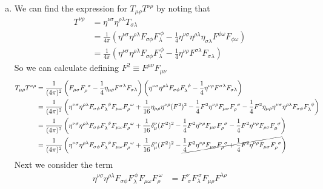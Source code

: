 \documentclass[11pt]{article}
\numberwithin{equation}{section}
\begin{document}
\begin{enumerate}[(a)]
\item
    We can find the expression for $T_{\mu\rho}T^{\nu\rho}$ by noting that
    \begin{align*}
        T^{\nu\rho} &= \eta^{\nu\sigma}\eta^{\rho\lambda}T_{\sigma\lambda}\\
                    &= \frac{1}{4\pi}\left(\eta^{\nu\sigma}\eta^{\rho\lambda}F_{\sigma\phi}F_{\lambda}^{\ \phi} - \frac{1}{4}\eta^{\nu\sigma}\eta^{\rho\lambda}\eta_{\sigma\lambda}F^{\phi\omega}F_{\phi\omega}\right)\\
                    &= \frac{1}{4\pi}\left(\eta^{\nu\sigma}\eta^{\rho\lambda}F_{\sigma\phi}F_{\lambda}^{\ \phi} - \frac{1}{4}\eta^{\nu\rho}F^{\sigma\lambda}F_{\sigma\lambda}\right)
    \end{align*}
    So we can calculate defining $F^2\equiv F^{\mu\nu}F_{\mu\nu}$
    \begin{align*}
        T_{\mu\rho}T^{\nu\rho} &= \frac{1}{(4\pi)^2}\left(F_{\mu\sigma}F^{\ \sigma}_{\rho} - \frac{1}{4}\eta_{\mu\rho}F^{\sigma\lambda}F_{\sigma\lambda} \right)\left(\eta^{\nu\sigma}\eta^{\rho\lambda}F_{\sigma\phi}F_{\lambda}^{\ \phi} - \frac{1}{4}\eta^{\nu\rho}F^{\sigma\lambda}F_{\sigma\lambda}\right)\\
                               &= \frac{1}{(4\pi)^2}\left(\eta^{\nu\sigma}\eta^{\rho\lambda}F_{\sigma\phi}F_{\lambda}^{\ \phi}F_{\mu\omega}F^{\ \omega}_{\rho} + \frac{1}{16}\eta_{\mu\rho}\eta^{\nu\rho}(F^2)^2 - \frac{1}{4}F^2\eta^{\nu\rho}F_{\mu\sigma}F^{\ \sigma}_{\rho} - \frac{1}{4}F^2\eta_{\mu\rho}\eta^{\nu\sigma}\eta^{\rho\lambda}F_{\sigma\phi}F_{\lambda}^{\ \phi}\right)\\
                               &= \frac{1}{(4\pi)^2}\left(\eta^{\nu\sigma}\eta^{\rho\lambda}F_{\sigma\phi}F_{\lambda}^{\ \phi}F_{\mu\omega}F^{\ \omega}_{\rho} + \frac{1}{16}\delta^{\nu}_{\mu}(F^2)^2 - \frac{1}{4}F^2\eta^{\nu\rho}F_{\mu\sigma}F^{\ \sigma}_{\rho} - \frac{1}{4}F^2\eta^{\nu\rho}F_{\rho\sigma}F_{\mu}^{\ \sigma}\right)\\
                               &= \frac{1}{(4\pi)^2}\left(\eta^{\nu\sigma}\eta^{\rho\lambda}F_{\sigma\phi}F_{\lambda}^{\ \phi}F_{\mu\omega}F^{\ \omega}_{\rho} + \frac{1}{16}\delta^{\nu}_{\mu}(F^2)^2 - \cancel{\frac{1}{4}F^2\eta^{\nu\rho}F_{\mu\sigma}F^{\ \sigma}_{\rho} + \frac{1}{4}F^2\eta^{\nu\rho}F_{\mu\sigma}F_{\rho}^{\ \sigma}}\right)
    \end{align*}
    Next we consider the term 
    \begin{align*}
        \eta^{\nu\sigma}\eta^{\rho\lambda}F_{\sigma\phi}F_{\lambda}^{\ \phi}F_{\mu\omega}F^{\ \omega}_{\rho} &= F^{\nu}_{\ \sigma}F_{\lambda}^{\ \sigma}F_{\mu\rho}F^{\lambda\rho} \\

\end{align*}
\end{enumerate}
\end{document}
